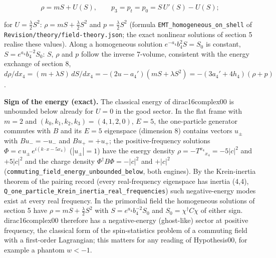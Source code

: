 \documentclass[11pt]{article}
\begin{document}
\[
\rho = m S + U(S), \qquad p_3 = p_t = p_0 = S\,U'(S) - U(S) ;
\]

for $U = \tfrac{\lambda}{2}S^2$: $\rho = mS + \tfrac{\lambda}{2}S^2$ and $p = \tfrac{\lambda}{2}S^2$ (formula \texttt{EMT\_homo\allowbreak{}geneous\_\allowbreak{}on\_shell} of \texttt{Revision\allowbreak{}/theory/\allowbreak{}field-th\allowbreak{}eory.jso\allowbreak{}n}; the exact nonlinear solutions of section 5 realise these values). Along a homogeneous solution $e^{-a_4}b_4^{2}S = S_0$ is constant, $S = e^{a_4}b_4^{-2}S_0$: $S$, $\rho$ and $p$ follow the inverse 7-volume, consistent with the energy exchange of section 8, $d\rho/dx_4 = (m + \lambda S)\,dS/dx_4 = -(2u - a_4')(mS + \lambda S^2) = -(3a_4' + 4h_4)(\rho + p)$.

\textbf{Sign of the energy (exact).} The classical energy of dirac16complex00 is unbounded below already for $U = 0$ in the good sector. In the flat frame with $m = 2$ and $(k_0, k_1, k_2, k_3) = (4, 1, 2, 0)$, $E = 5$, the one-particle generator commutes with $B$ and its $E = 5$ eigenspace (dimension 8) contains vectors $u_\pm$ with $Bu_- = -u_-$ and $Bu_+ = +u_+$; the positive-frequency solutions $\Phi = c\,u_\pm\,e^{i(k\cdot x - 5x_4)}$ ($|u_\pm| = 1$) have the energy density $\rho = -T^{x_4}{}_{x_4} = -5|c|^2$ and $+5|c|^2$ and the charge density $\Phi^\dagger B\Phi = -|c|^2$ and $+|c|^2$ (\texttt{commutin\allowbreak{}g\_field\_\allowbreak{}energy\_u\allowbreak{}nbounded\allowbreak{}\_below}, both engines). By the Krein-inertia theorem of the pairing record (every real-frequency eigenspace has inertia (4,4), \texttt{Q\_one\_pa\allowbreak{}rticle\_K\allowbreak{}rein\_ine\allowbreak{}rtia\_rea\allowbreak{}l\_freque\allowbreak{}ncies}) such negative-energy modes exist at every real frequency. In the primordial field the homogeneous solutions of section 5 have $\rho = mS + \tfrac{\lambda}{2}S^2$ with $S = e^{a_4}b_4^{-2}S_0$ and $S_0 = \chi^\dagger C\chi$ of either sign. dirac16complex00 therefore has a negative-energy (ghost-like) sector at positive frequency, the classical form of the spin-statistics problem of a commuting field with a first-order Lagrangian; this matters for any reading of Hypothesis00, for example a phantom $w < -1$.
\end{document}
